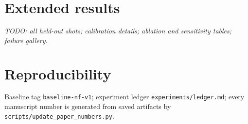 \documentclass[11pt]{article}
\begin{document}
\section{Extended results}
\label{app:extresults}
\emph{TODO: all held-out shots; calibration details; ablation and
sensitivity tables; failure gallery.}

\section{Reproducibility}
\label{app:repro}
Baseline tag \texttt{baseline-nf-v1}; experiment ledger
\texttt{experiments/ledger.md}; every manuscript number is generated from
saved artifacts by \texttt{scripts/update\_paper\_numbers.py}.
\end{document}

